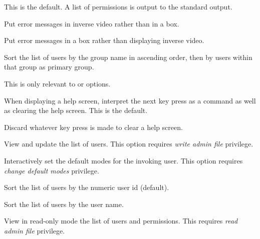 
This is the default. A list of permissions is output to the standard output.


Put error messages in inverse video rather than in a box.


Put error messages in a box rather than displaying inverse video.


Sort the list of users by the group name in ascending order, then by users within that group as primary group.

This is only relevant to  or  options.


When displaying a help screen, interpret the next key press as a command as well as clearing the help screen. This is the
default.


Discard whatever key press is made to clear a help screen.


View and update the list of users. This option requires \textit{write admin file} privilege.


Interactively set the default modes for the invoking user. This option requires \textit{change default modes} privilege.


Sort the list of users by the numeric user id (default).


Sort the list of users by the user name.


View in read-only mode the list of users and permissions. This requires \textit{read admin file} privilege.

